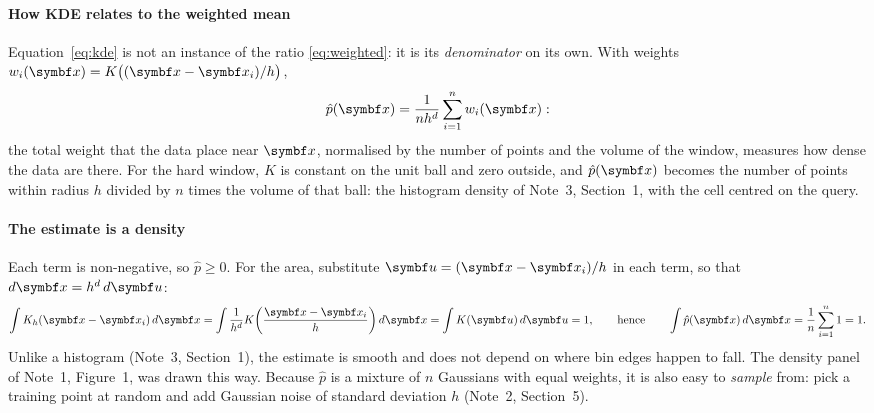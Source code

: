 \documentclass[11pt]{article}
\begin{document}
\paragraph{How KDE relates to the weighted mean} Equation~\eqref{eq:kde} is not an instance of the ratio
\eqref{eq:weighted}: it is its \emph{denominator} on its own. With weights $w_i(\x) = K\big((\x - \x_i)/h\big)$,
\[
  \hat p(\x) = \frac{1}{n h^d} \sum_{i=1}^n w_i(\x) :
\]
the total weight that the data place near $\x$, normalised by the number of points and the volume of the window,
measures how dense the data are there. For the hard window, $K$ is constant on the unit ball and zero outside, and
$\hat p(\x)$ becomes the number of points within radius $h$ divided by $n$ times the volume of that ball: the
histogram density of Note~3, Section~1, with the cell centred on the query.

\paragraph{The estimate is a density} Each term is non-negative, so $\hat p \ge 0$. For the area, substitute
$\vect{u} = (\x - \x_i)/h$ in each term, so that $d\x = h^d\, d\vect{u}$:
\[
  \int K_h(\x - \x_i)\, d\x = \int \frac{1}{h^d} K\!\left(\frac{\x - \x_i}{h}\right) d\x
  = \int K(\vect{u})\, d\vect{u} = 1,
  \qquad\text{hence}\qquad \int \hat p(\x)\, d\x = \frac{1}{n} \sum_{i=1}^n 1 = 1 .
\]
Unlike a histogram (Note~3, Section~1), the estimate is smooth and does not depend on where bin edges happen to fall.
The density panel of Note~1, Figure~1, was drawn this way. Because $\hat p$ is a mixture of $n$ Gaussians with equal
weights, it is also easy to \emph{sample} from: pick a training point at random and add Gaussian noise of standard
deviation $h$ (Note~2, Section~5).
\end{document}

